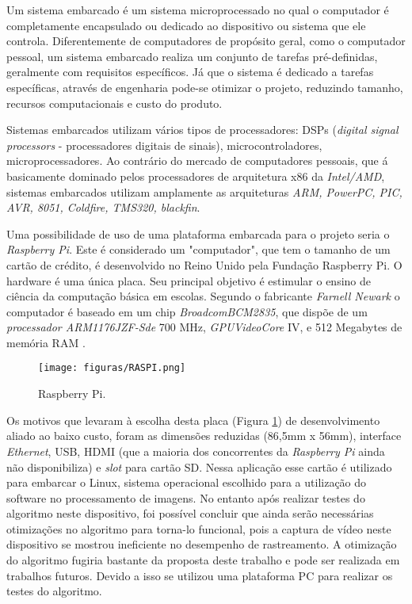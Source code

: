 Um sistema embarcado é um sistema microprocessado no qual o computador é completamente encapsulado ou dedicado ao dispositivo ou sistema que ele controla. Diferentemente de computadores de propósito geral, como o computador pessoal, um sistema embarcado realiza um conjunto de tarefas pré-definidas, geralmente com requisitos específicos. Já que o sistema é dedicado a tarefas específicas, através de engenharia pode-se otimizar o projeto, reduzindo tamanho, recursos computacionais e custo do produto. 

Sistemas embarcados utilizam vários tipos de processadores: DSPs (\textit{digital signal processors} - processadores digitais de sinais), microcontroladores, microprocessadores. Ao contrário do mercado de computadores pessoais, que á basicamente dominado pelos processadores de arquitetura x86 da \textit{Intel/AMD}, sistemas embarcados utilizam amplamente as arquiteturas \textit{ARM, PowerPC, PIC, AVR, 8051, Coldfire, TMS320, blackfin}.

Uma possibilidade de uso de uma plataforma embarcada para o projeto seria o \textit{Raspberry Pi}. Este é considerado um "computador", que tem o tamanho de um cartão de crédito, é desenvolvido no Reino Unido pela Fundação Raspberry Pi. O hardware é uma única placa. Seu principal objetivo é estimular o ensino de ciência da computação básica em escolas. Segundo o fabricante \textit{Farnell Newark} o computador é baseado em um chip \textit{BroadcomBCM2835}, que dispõe de um \textit{processador ARM1176JZF-Sde} 700 MHz, \textit{GPUVideoCore} IV, e 512 Megabytes de memória RAM \cite{DRossJLimRSLinMHang}.

\begin{figure}
	\centering
	\texttt{[image: figuras/RASPI.png]}
    \caption{Raspberry Pi.}
    \label{RASPI}
\end{figure}

Os motivos que levaram à escolha desta placa (Figura \ref{RASPI}) de desenvolvimento aliado ao baixo custo, foram as dimensões reduzidas (86,5mm x 56mm), interface \textit{Ethernet}, USB, HDMI (que a maioria dos concorrentes da \textit{Raspberry Pi} ainda não disponibiliza) e \textit{slot} para cartão SD. Nessa aplicação esse cartão é utilizado para embarcar o Linux, sistema operacional escolhido para a utilização do software no processamento de imagens. No entanto após realizar testes do algoritmo neste dispositivo, foi possível concluir que ainda serão necessárias otimizações no algoritmo para torna-lo funcional, pois a captura de vídeo neste dispositivo se mostrou ineficiente no desempenho de rastreamento. A otimização do algoritmo fugiria bastante da proposta deste trabalho e pode ser realizada em trabalhos futuros. Devido a isso se utilizou uma plataforma PC para realizar os testes do algoritmo. 

